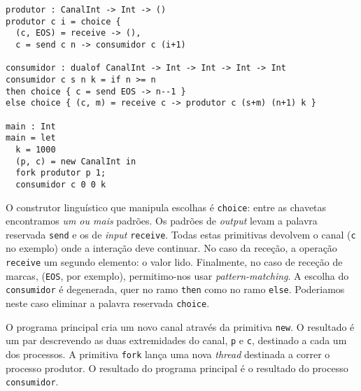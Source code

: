 \begin{lstlisting}
produtor : CanalInt -> Int -> ()
produtor c i = choice {
  (c, EOS) = receive -> (),
  c = send c n -> consumidor c (i+1)

consumidor : dualof CanalInt -> Int -> Int -> Int -> Int
consumidor c s n k = if n >= n
then choice { c = send EOS -> n--1 }
else choice { (c, m) = receive c -> produtor c (s+m) (n+1) k }

main : Int
main = let
  k = 1000
  (p, c) = new CanalInt in
  fork produtor p 1;
  consumidor c 0 0 k
\end{lstlisting}

O construtor linguístico que manipula escolhas é \lstinline|choice|:
entre as chavetas encontramos \emph{um ou mais} padrões. Os padrões de
\textit{output} levam a palavra reservada \lstinline|send| e os de
\textit{input} \lstinline|receive|. Todas estas primitivas devolvem o
canal (\lstinline|c| no exemplo) onde a interação deve continuar. No
caso da receção, a operação \lstinline|receive| um segundo elemento: o
valor lido. Finalmente, no caso de receção de marcas,
(\lstinline|EOS|, por exemplo), permitimo-nos usar
\textit{pattern-matching}.
%
A escolha do \lstinline|consumidor| é degenerada, quer no ramo
\lstinline|then| como no ramo \lstinline|else|. Poderiamos neste caso
eliminar a palavra reservada \lstinline|choice|.

O programa principal cria um novo canal através da primitiva
\lstinline|new|. O resultado é um par descrevendo as duas extremidades
do canal, \lstinline|p| e \lstinline|c|, destinado a cada um dos
processos.
%
A primitiva \lstinline|fork| lança uma nova \textit{thread} destinada
a correr o processo produtor. O resultado do programa principal é o
resultado do processo \lstinline|consumidor|.

